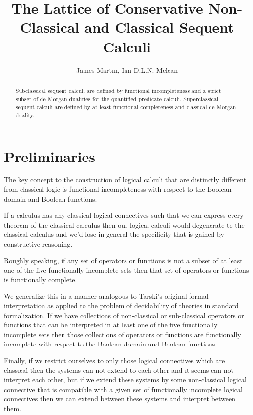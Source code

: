 \documentclass{article}
\author{James Martin, Ian D.L.N. Mclean}
\title{The Lattice of Conservative Non-Classical and Classical Sequent Calculi}
\begin{document}
\maketitle

\begin{abstract}
Subclassical sequent calculi are defined by functional incompleteness and a strict subset of de Morgan dualities for the quantified predicate calculi.
Superclassical sequent calculi are defined by at least functional completeness and classical de Morgan duality.
\end{abstract}

\part{Preliminaries}
\begin{center}
	\begin{flushleft}
		The key concept to the construction of logical calculi that are distinctly different from classical logic is functional incompleteness with respect to the Boolean domain and Boolean functions.
	\end{flushleft}
	\begin{flushleft}
		If a calculus has any classical logical connectives such that we can express every theorem of the classical calculus then our logical calculi would degenerate to the classical calculus and we'd lose in general the specificity that is gained by constructive reasoning.
	\end{flushleft}
	\begin{flushleft}
		Roughly speaking, if any set of operators or functions is not a subset of at least one of the five functionally incomplete sets then that set of operators or functions is functionally complete.
	\end{flushleft}
	\begin{flushleft}
		We generalize this in a manner analogous to Tarski's original formal interpretation as applied to the problem of decidability of theories in standard formalization. If we have collections of non-classical or sub-classical operators or functions that can be interpreted in at least one of the five functionally incomplete sets then those collections of operators or functions are functionally incomplete with respect to the Boolean domain and Boolean functions.
	\end{flushleft}
	\begin{flushleft}
		Finally, if we restrict ourselves to only those logical connectives which are classical then the systems can not extend to each other and it seems can not interpret each other, but if we extend these systems by some non-classical logical connective that is compatible with a given set of functionally incomplete logical connectives then we can extend between these systems and interpret between them.
	\end{flushleft}

\end{center}
\end{document}
